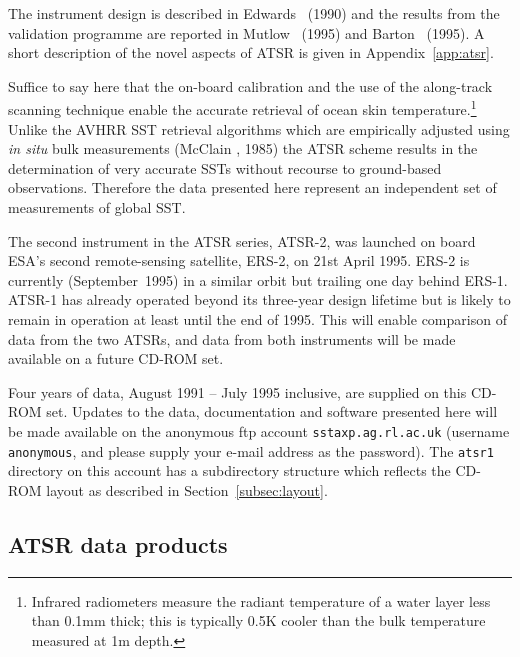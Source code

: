 The instrument design is described in Edwards \etal\ (1990)
and the results from the validation programme  are reported in 
Mutlow \etal\ (1995) and  Barton \etal\ (1995).
A short description of the novel aspects of ATSR is given 
in Appendix~\ref{app:atsr}.

Suffice to say here that the on-board calibration and the use of the 
along-track scanning technique enable the accurate retrieval of ocean skin
temperature.\footnote{Infrared radiometers measure the radiant 
temperature of a water layer 
less than 0.1{\thinspace}mm thick; this is typically 0.5K cooler than 
the bulk temperature measured at 1{\thinspace}m depth.}
Unlike the AVHRR SST retrieval algorithms which are
empirically adjusted using {\sl in situ\/} bulk measurements 
(McClain \etal, 1985) 
the ATSR scheme results in the determination of very accurate SSTs without 
recourse to ground-based observations.
Therefore the data presented here represent an independent set of 
measurements of global SST.

The second instrument in the ATSR series, ATSR-2, was launched on board 
ESA's second remote-sensing satellite, ERS-2, on 21st April 1995.
ERS-2 is currently (September~1995) in a similar orbit but trailing  one 
day behind ERS-1.
ATSR-1 has already operated beyond its three-year design lifetime  
but is likely to remain in operation at least until the end of 1995.
This will enable comparison of data from the two ATSRs, and 
data from both instruments will be made available on a future CD-ROM set.

Four years of data,  August 1991 -- July 1995 inclusive, are 
supplied on this CD-ROM set.
Updates to the data, documentation and software presented here will 
be made available on the anonymous ftp account {\tt sstaxp.ag.rl.ac.uk}
(username {\tt anonymous}, and please supply your e-mail address as 
the password).
The {\tt atsr1} directory  on this account has a subdirectory
structure which reflects the CD-ROM layout as described in 
Section~\ref{subsec:layout}.


\subsection{ATSR data products}
\label{subsec:introdata}

